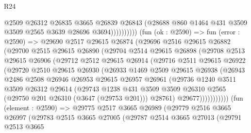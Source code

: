 \begin{lexlean}{R24}
\begin{coremodule}
                          @2509
                          @26312
                          @26835
                          @3665
                          @26839
                          @26843
                          (@28688 @860 @1464 @431 @3509 @3509 @2565 @3639 @28696 @3694))))))))))
        (fun (ok : @2590) =>
        fun (error : @2590) =>
        @29690
          @2517
          @29615
          @26874
          (@29696
            @2516
            @29615
            @26882
            (@29700
              @2515
              @29615
              @26890
              (@29704
                @2514
                @29615
                @26898
                (@29708
                  @2513
                  @29615
                  @26906
                  (@29712
                    @2512
                    @29615
                    @26914
                    (@29716
                      @2511
                      @29615
                      @26922
                      (@29720
                        @2510
                        @29615
                        @26930
                        (@26933
                          @1469
                          @2509
                          @29615
                          @26938
                          (@26943
                            @2486
                            @2508
                            @26946
                            @26953
                            @29615
                            @26957
                            @26961
                            (@29736
                              @1240
                              @3511
                              @3509
                              @26312
                              @29614
                              (@29743
                                @1238
                                @431
                                @3509
                                @3509
                                @26310
                                @2565
                                (@29750 @201 @26310 (@3647 (@29753 @201)))
                                @28761)
                              @29677)))))))))))
        (fun (element : @2590) =>
        @29775
          @2517
          @3665
          @26989
          (@29779
            @2516
            @3665
            @26997
            (@29783
              @2515
              @3665
              @27005
              (@29787
                @2514
                @3665
                @27013
                (@29791
                  @2513
                  @3665

\end{coremodule}
\end{lexlean}
